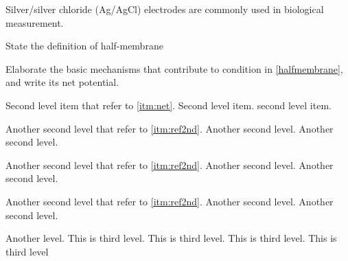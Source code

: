 \question

Silver/silver chloride (Ag/AgCl) electrodes are commonly used in biological measurement.



\listbegin	%
	\item \label{halfmembrane} State the definition of half-membrane
	
	
	
	\item \label{itm:net} Elaborate the basic mechanisms that contribute to condition in \ref{halfmembrane}, and write its net potential. %
	
	

	\listbegin %
		\item \label{itm:ref2nd} Second level item that refer to \ref{itm:net}. Second level item. second level item. 
		
		
		\item Another second level that refer to \ref{itm:ref2nd}. Another second level. Another second level.
		
		
		\item Another second level that refer to \ref{itm:ref2nd}. Another second level. Another second level.
		
		
		\item Another second level that refer to \ref{itm:ref2nd}. Another second level. Another second level.
		


		\listbegin %
			\item Another level. This is third level. This is third level. This is third level. This is third level
			
